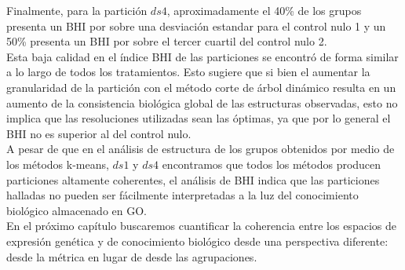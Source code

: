 Finalmente, para la partición $ds4$, aproximadamente el 40\% de los grupos presenta un BHI por sobre una desviación estandar para el control nulo 1 y un 50\% presenta un BHI por sobre el tercer cuartil del control nulo 2.\\ 
Esta baja calidad en el índice BHI de las particiones se encontró de forma similar a lo largo de todos los tratamientos. Esto sugiere que si bien el aumentar la granularidad de la partición con el método corte de árbol dinámico resulta en un aumento de la consistencia biológica global de las estructuras observadas, esto no implica que las resoluciones utilizadas sean las óptimas, ya que por lo general el BHI no es superior al del control nulo.\\
A pesar de que en el análisis de estructura de los grupos obtenidos por medio de los métodos k-means, $ds1$ y $ds4$ encontramos que todos los métodos producen particiones altamente coherentes, el análisis de BHI indica que las particiones halladas no pueden ser fácilmente interpretadas a la luz del conocimiento biológico almacenado en GO.\\
En el próximo capítulo buscaremos cuantificar la coherencia entre los espacios de expresión genética y de conocimiento biológico desde una perspectiva diferente: desde la métrica en lugar de desde las agrupaciones.
